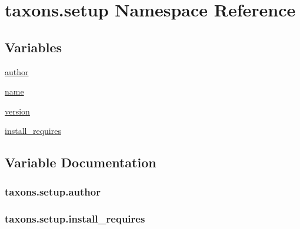 \hypertarget{namespacetaxons_1_1setup}{}\section{taxons.\+setup Namespace Reference}
\label{namespacetaxons_1_1setup}
\subsection*{Variables}
\begin{DoxyCompactItemize}
\item 
\hyperlink{namespacetaxons_1_1setup_a8efc0b25164df1b285dd5d20b461c6a6}{author}
\item 
\hyperlink{namespacetaxons_1_1setup_a5bcdb0d159c4f8eb3ef55b6f918945fa}{name}
\item 
\hyperlink{namespacetaxons_1_1setup_a8e299eb9f9c2a310e6c6d4c5ec1357a0}{version}
\item 
\hyperlink{namespacetaxons_1_1setup_ab9d2103d11e43064b2d572398a52fe08}{install\+\_\+requires}
\end{DoxyCompactItemize}


\subsection{Variable Documentation}
\subsubsection[{\texorpdfstring{author}{author}}]{\setlength{\rightskip}{0pt plus 5cm}taxons.\+setup.\+author}\hypertarget{namespacetaxons_1_1setup_a8efc0b25164df1b285dd5d20b461c6a6}{}\label{namespacetaxons_1_1setup_a8efc0b25164df1b285dd5d20b461c6a6}
\subsubsection[{\texorpdfstring{install\+\_\+requires}{install_requires}}]{\setlength{\rightskip}{0pt plus 5cm}taxons.\+setup.\+install\+\_\+requires}\hypertarget{namespacetaxons_1_1setup_ab9d2103d11e43064b2d572398a52fe08}{}\label{namespacetaxons_1_1setup_ab9d2103d11e43064b2d572398a52fe08}
